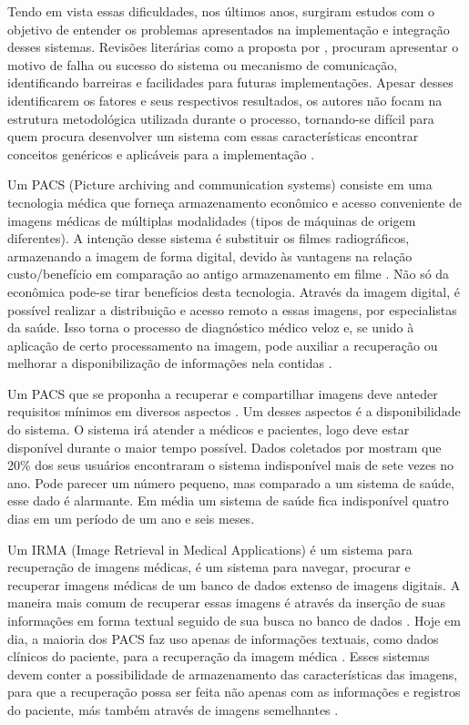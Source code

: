 Tendo em vista essas dificuldades, nos últimos anos, surgiram estudos com o objetivo de entender os problemas apresentados na implementação e integração desses sistemas.
Revisões literárias como a proposta por \cite{REF02}, procuram apresentar o motivo de falha ou sucesso do sistema ou mecanismo de comunicação, identificando barreiras e facilidades para futuras implementações.
Apesar desses identificarem os fatores e seus respectivos resultados, os autores não focam na estrutura metodológica utilizada durante o processo, tornando-se difícil para quem procura desenvolver um sistema com essas características encontrar conceitos genéricos e aplicáveis para a implementação \cite{REF09}.

Um PACS (Picture archiving and communication systems) consiste em uma tecnologia médica que forneça armazenamento econômico e acesso conveniente de imagens médicas de múltiplas modalidades (tipos de máquinas de origem diferentes).
A intenção desse sistema é substituir os filmes radiográficos, armazenando a imagem de forma digital, devido às vantagens na relação custo/benefício em comparação ao antigo armazenamento em filme \cite{REF13}.
Não só da econômica pode-se tirar benefícios desta tecnologia.
Através da imagem digital, é possível realizar a distribuição e acesso remoto a essas imagens, por especialistas da saúde.
Isso torna o processo de diagnóstico médico veloz e, se unido à aplicação de certo processamento na imagem, pode auxiliar a recuperação ou melhorar a disponibilização de informações nela contidas \cite{REF05}.

Um PACS que se proponha a recuperar e compartilhar imagens deve anteder requisitos mínimos em diversos aspectos \cite{REF03}.
Um desses aspectos é a disponibilidade do sistema.
O sistema irá atender a médicos e pacientes, logo deve estar disponível durante o maior tempo possível.
Dados coletados por \cite{REF19} mostram que 20\% dos seus usuários encontraram o sistema indisponível mais de sete vezes no ano.
Pode parecer um número pequeno, mas comparado a um sistema de saúde, esse dado é alarmante.
Em média um sistema de saúde fica indisponível quatro dias em um período de um ano e seis meses.

Um IRMA (Image Retrieval in Medical Applications) é um sistema para recuperação de imagens médicas, é um sistema para navegar, procurar e recuperar imagens médicas de um banco de dados extenso de imagens digitais.
A maneira mais comum de recuperar essas imagens é através da inserção de suas informações em forma textual seguido de sua busca no banco de dados \cite{REF08}.
Hoje em dia, a maioria dos PACS faz uso apenas de informações textuais, como dados clínicos do paciente, para a recuperação da imagem médica \cite{REF04}.
Esses sistemas devem conter a possibilidade de armazenamento das características das imagens, para que a recuperação possa ser feita não apenas com as informações e registros do paciente, más também através de imagens semelhantes \cite{REF10}.

